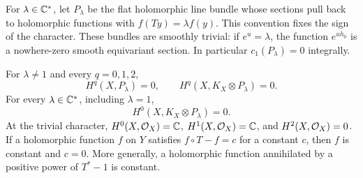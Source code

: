 For $\lambda\in\mathbb C^*$, let $P_\lambda$ be the flat holomorphic line bundle
whose sections pull back to holomorphic functions with
$f(Ty)=\lambda f(y)$. This convention fixes the sign of the character.
These bundles are smoothly trivial: if $e^u=\lambda$, the function
$e^{u h_0}$ is a nowhere-zero smooth equivariant section. In particular
$c_1(P_\lambda)=0$ integrally.

\begin{lemma}\label{surface:characters}
For $\lambda\neq1$ and every $q=0,1,2$,
\begin{equation}\label{surface:acyclic}
 H^q(X,P_\lambda)=0,
 \qquad H^q(X,K_X\otimes P_\lambda)=0.
\end{equation}
For every $\lambda\in\mathbb C^*$, including $\lambda=1$,
\begin{equation}\label{surface:canonical-vanishing}
 H^0(X,K_X\otimes P_\lambda)=0.
\end{equation}
At the trivial character,
$H^0(X,\mathcal O_X)=\mathbb C$, $H^1(X,\mathcal O_X)=\mathbb C$, and $H^2(X,\mathcal O_X)=0$.
If a holomorphic function $f$ on $Y$ satisfies $f\circ T-f=c$ for a
constant $c$, then $f$ is constant and $c=0$. More generally, a holomorphic
function annihilated by a positive power of $T^*-1$ is constant.
\end{lemma}

